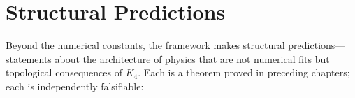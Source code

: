 \documentclass[11pt,a4paper]{book}
\begin{document}
\begin{code}
\\
\>[0][@{}l@{\AgdaIndent{0}}]%
\>[2]\AgdaSymbol{\{}\AgdaSpace{}%
%
\>[17]\AgdaSymbol{=}\AgdaSpace{}%
\<%
\\
%
\>[2]\AgdaSymbol{;}\AgdaSpace{}%
%
\>[17]\AgdaSymbol{=}\AgdaSpace{}%
\<%
\\
%
\>[2]\AgdaSymbol{;}\AgdaSpace{}%
%
\>[17]\AgdaSymbol{=}\AgdaSpace{}%
\<%
\\
%
\>[2]\AgdaSymbol{;}\AgdaSpace{}%
%
\>[17]\AgdaSymbol{=}\AgdaSpace{}%
\<%
\\
%
\>[2]\AgdaSymbol{;}\AgdaSpace{}%
\AgdaSpace{}%
\AgdaSymbol{=}\AgdaSpace{}%
\<%
\\
%
\>[2]\AgdaSymbol{;}\AgdaSpace{}%
\AgdaSpace{}%
\AgdaSymbol{=}\AgdaSpace{}%
\<%
\\
%
\>[2]\AgdaSymbol{;}\AgdaSpace{}%
\AgdaSpace{}%
\AgdaSymbol{=}\AgdaSpace{}%
\AgdaSpace{}%
\AgdaSymbol{\}}\<%
\end{code}

\section*{Structural Predictions}

Beyond the numerical constants, the framework makes structural predictions---statements about the architecture of physics that are not numerical fits but topological consequences of $K_4$. Each is a theorem proved in preceding chapters; each is independently falsifiable:
\end{document}
